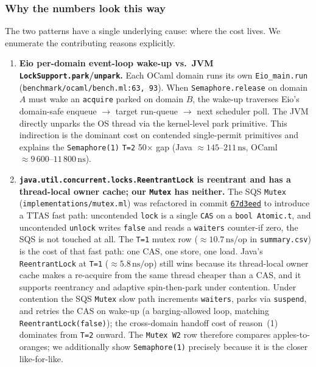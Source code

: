 \documentclass[11pt,a4paper]{article}
\newcommand{\commit}[1]{%
  \href{https://github.com/durwasa-chakraborty/CS6868_Concurrent_Programming_Project/commit/#1}%
       {\texttt{#1}}}
\begin{document}
\subsubsection{Why the numbers look this way}
\label{sec:eval-reasons}

The two patterns have a single underlying cause: where the cost lives.
We enumerate the contributing reasons explicitly.

\begin{enumerate}
\item \textbf{Eio per-domain event-loop wake-up vs.\ JVM
  \texttt{LockSupport.park}/\texttt{unpark}.} Each OCaml domain runs
  its own \texttt{Eio\_main.run} (\texttt{benchmark/ocaml/bench.ml:63,~93}).
  When \texttt{Semaphore.release} on domain $A$ must wake an
  \texttt{acquire} parked on domain $B$, the wake-up traverses Eio's
  domain-safe enqueue $\rightarrow$ target run-queue $\rightarrow$ next
  scheduler poll. The JVM directly unparks the OS thread via the
  kernel-level park primitive. This indirection is the dominant cost
  on contended single-permit primitives and explains the
  \texttt{Semaphore(1)} \texttt{T=2} 50$\times$ gap (Java
  $\approx 145\text{--}211\,\text{ns}$, OCaml
  $\approx 9\,600\text{--}11\,800\,\text{ns}$).

\item \textbf{\texttt{java.util.concurrent.locks.ReentrantLock} is
  reentrant and has a thread-local owner cache; our \texttt{Mutex}
  has neither.} The SQS \texttt{Mutex}
  (\texttt{implementations/mutex.ml}) was refactored in commit
  \commit{67d3eed} to introduce a TTAS fast path: uncontended
  \texttt{lock} is a single \texttt{CAS} on a \texttt{bool Atomic.t},
  and uncontended \texttt{unlock} writes \texttt{false} and reads a
  \texttt{waiters} counter-if zero, the SQS is not touched at
  all. The \texttt{T=1} mutex row ($\approx 10.7\,\text{ns/op}$ in
  \texttt{summary.csv}) is the cost of that fast path: one CAS, one
  store, one load. Java's \texttt{ReentrantLock} at \texttt{T=1}
  ($\approx 5.8\,\text{ns/op}$) still wins because its thread-local
  owner cache makes a re-acquire from the same thread cheaper than a
  CAS, and it supports reentrancy and adaptive spin-then-park under
  contention. Under contention the SQS \texttt{Mutex} slow path
  increments \texttt{waiters}, parks via \texttt{suspend}, and
  retries the CAS on wake-up (a barging-allowed loop, matching
  \texttt{ReentrantLock(false)}); the cross-domain handoff cost of
  reason~(1) dominates from \texttt{T=2} onward. The \texttt{Mutex
  W2} row therefore compares apples-to-oranges; we additionally show
  \texttt{Semaphore(1)} precisely because it is the closer
  like-for-like.


\end{enumerate}
\end{document}
